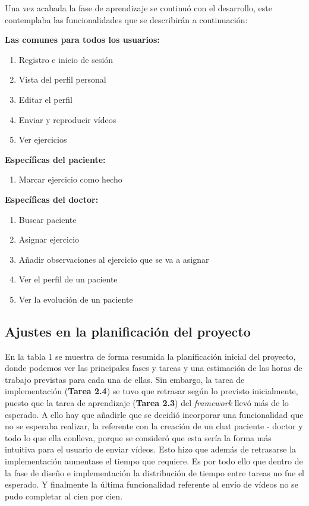 \medskip
Una vez acabada la fase de aprendizaje se continuó con el desarrollo, este contemplaba las funcionalidades
que se describirán a continuación:

\medskip
\textbf{Las comunes para todos los usuarios:}
\begin{enumerate}
    \item Registro e inicio de sesión
    \item Vista del perfil personal
    \item Editar el perfil
    \item Enviar y reproducir vídeos
    \item Ver ejercicios
\end{enumerate}

\medskip
\textbf{Específicas del paciente:}
\begin{enumerate}
    \item Marcar ejercicio como hecho
\end{enumerate}

\medskip
\textbf{Específicas del doctor:}
\begin{enumerate}
    \item Buscar paciente
    \item Asignar ejercicio
    \item Añadir observaciones al ejercicio que se va a asignar
    \item Ver el perfil de un paciente
    \item Ver la evolución de un paciente
\end{enumerate}

\subsection{Ajustes en la planificación del proyecto}
En la tabla 1 se muestra de forma resumida la planificación inicial del proyecto, donde
podemos ver las principales fases y tareas y una estimación de las horas de trabajo
previstas para cada una de ellas. Sin embargo, la tarea de implementación (\textbf{Tarea 2.4})
se tuvo que retrasar según lo previsto inicialmente,
puesto que la tarea de aprendizaje (\textbf{Tarea 2.3}) del \textit{framework} llevó más de lo esperado.
A ello hay que añadirle que se decidió incorporar una funcionalidad que no se esperaba realizar,
la referente con la creación de un chat paciente - doctor y todo lo que ella conlleva, porque se
consideró que esta sería la forma más intuitiva para el usuario de enviar vídeos. Esto hizo que además
de retrasarse la implementación aumentase el tiempo que requiere. Es por todo ello que
dentro de la fase de diseño e implementación la distribución de tiempo entre tareas no fue el esperado.
Y finalmente la última funcionalidad referente al envío de vídeos no se pudo completar al cien por cien.


